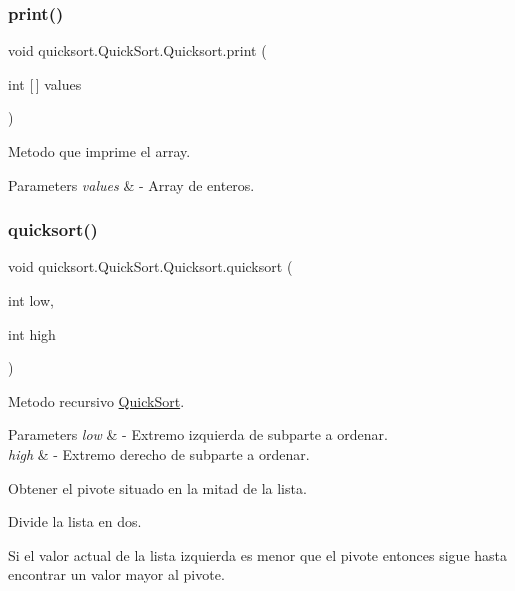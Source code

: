 \subsubsection{\texorpdfstring{print()}{print()}}
{\footnotesize\ttfamily void quicksort.\+Quick\+Sort.\+Quicksort.\+print (\begin{DoxyParamCaption}\item[{int \mbox{[}$\,$\mbox{]}}]{values }\end{DoxyParamCaption})}



Metodo que imprime el array. 


\begin{DoxyParams}{Parameters}
{\em values} & -\/ Array de enteros. \\
\hline
\end{DoxyParams}
\hypertarget{classquicksort_1_1_quick_sort_1_1_quicksort_acebd97e5f32c5170226150de796e9c85}{}\label{classquicksort_1_1_quick_sort_1_1_quicksort_acebd97e5f32c5170226150de796e9c85} 
\subsubsection{\texorpdfstring{quicksort()}{quicksort()}}
{\footnotesize\ttfamily void quicksort.\+Quick\+Sort.\+Quicksort.\+quicksort (\begin{DoxyParamCaption}\item[{int}]{low,  }\item[{int}]{high }\end{DoxyParamCaption})\hspace{0.3cm}{\ttfamily [private]}}



Metodo recursivo \hyperlink{namespacequicksort_1_1_quick_sort}{Quick\+Sort}. 


\begin{DoxyParams}{Parameters}
{\em low} & -\/ Extremo izquierda de subparte a ordenar. \\
\hline
{\em high} & -\/ Extremo derecho de subparte a ordenar. \\
\hline
\end{DoxyParams}
Obtener el pivote situado en la mitad de la lista.

Divide la lista en dos.

Si el valor actual de la lista izquierda es menor que el pivote entonces sigue hasta encontrar un valor mayor al pivote.

